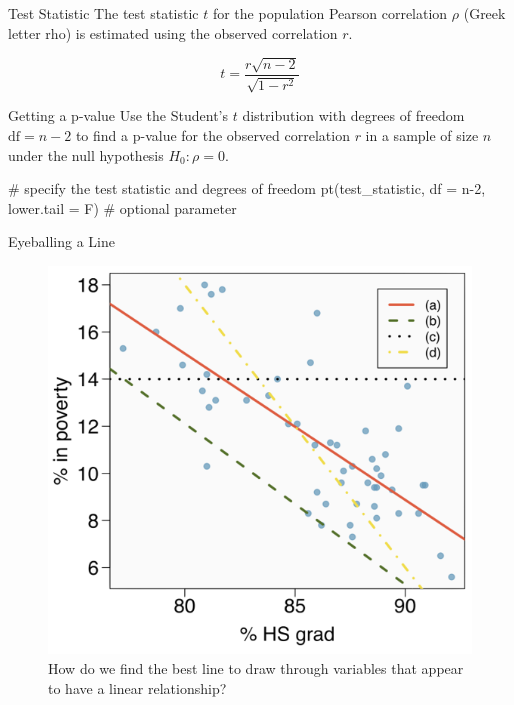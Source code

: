\documentclass[
  ignorenonframetext,
]{beamer}
\newenvironment{Shaded}{\begin{snugshade}}{\end{snugshade}}
\newcommand{\AttributeTok}[1]{\textcolor[rgb]{0.40,0.45,0.13}{#1}}
\newcommand{\CommentTok}[1]{\textcolor[rgb]{0.37,0.37,0.37}{#1}}
\newcommand{\DecValTok}[1]{\textcolor[rgb]{0.68,0.00,0.00}{#1}}
\newcommand{\FunctionTok}[1]{\textcolor[rgb]{0.28,0.35,0.67}{#1}}
\newcommand{\NormalTok}[1]{\textcolor[rgb]{0.00,0.23,0.31}{#1}}
\begin{document}
\begin{frame}{Test Statistic}
\label{test-statistic}
The test statistic \(t\) for the population Pearson correlation \(\rho\)
(Greek letter rho) is estimated using the observed correlation \(r\).

\[
t=\frac{r\sqrt{n-2}}{\sqrt{1-r^2}}
\]
\end{frame}

\begin{frame}[fragile]{Getting a p-value}
\label{getting-a-p-value}
Use the Student's \(t\) distribution with degrees of freedom
\(\text{df}=n-2\) to find a p-value for the observed correlation \(r\)
in a sample of size \(n\) under the null hypothesis
\(H_0 \colon \rho=0\).

\begin{Shaded}
\begin{Highlighting}[]
\CommentTok{\# specify the test statistic and degrees of freedom}
\FunctionTok{pt}\NormalTok{(test\_statistic,}
   \AttributeTok{df =}\NormalTok{ n}\DecValTok{{-}2}\NormalTok{,}
   \AttributeTok{lower.tail =}\NormalTok{ F) }\CommentTok{\# optional parameter}
\end{Highlighting}
\end{Shaded}
\end{frame}

\begin{frame}{Eyeballing a Line}
\label{eyeballing-a-line}
\begin{figure}[H]

{\centering \includegraphics{class31_files/mediabag/eyeball-line.png}

}

\caption{How do we find the best line to draw through variables that
appear to have a linear relationship?}

\end{figure}%
\end{frame}
\end{document}
